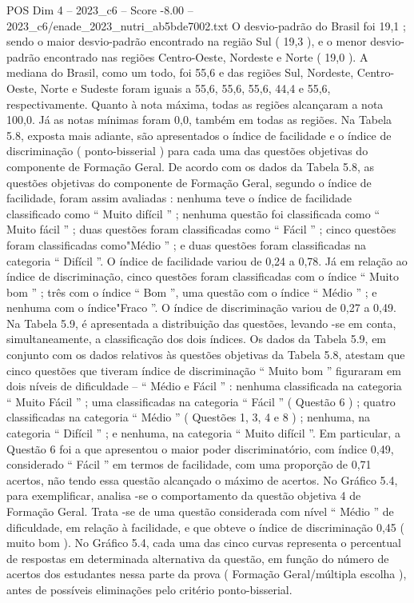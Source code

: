 \begin{textsample}{POS Dim 4 – 2023\_c6 – Score -8.00 – 2023\_c6/enade\_2023\_nutri\_ab5bde7002.txt}
O desvio-padrão do Brasil foi 19,1 ; sendo o maior desvio-padrão encontrado na região Sul ( 19,3 ), e o menor desvio-padrão encontrado nas regiões Centro-Oeste, Nordeste e Norte ( 19,0 ).
A mediana do Brasil, como um todo, foi 55,6 e das regiões Sul, Nordeste, Centro-Oeste, Norte e Sudeste foram iguais a 55,6, 55,6, 55,6, 44,4 e 55,6, respectivamente.
Quanto à nota máxima, todas as regiões alcançaram a nota 100,0.
Já as notas mínimas foram 0,0, também em todas as regiões.
Na Tabela 5.8, exposta mais adiante, são apresentados o índice de facilidade e o índice de discriminação ( ponto-bisserial ) para cada uma das questões objetivas do componente de Formação Geral.
De acordo com os dados da Tabela 5.8, as questões objetivas do componente de Formação Geral, segundo o índice de facilidade, foram assim avaliadas : nenhuma teve o índice de facilidade classificado como “ Muito difícil ” ; nenhuma questão foi classificada como “ Muito fácil ” ; duas questões foram classificadas como “ Fácil ” ; cinco questões foram classificadas como"Médio ” ; e duas questões foram classificadas na categoria “ Difícil ”.
O índice de facilidade variou de 0,24 a 0,78.
Já em relação ao índice de discriminação, cinco questões foram classificadas com o índice “ Muito bom ” ; três com o índice “ Bom ”, uma questão com o índice “ Médio ” ; e nenhuma com o índice"Fraco ”.
O índice de discriminação variou de 0,27 a 0,49.
Na Tabela 5.9, é apresentada a distribuição das questões, levando -se em conta, simultaneamente, a classificação dos dois índices.
Os dados da Tabela 5.9, em conjunto com os dados relativos às questões objetivas da Tabela 5.8, atestam que cinco questões que tiveram índice de discriminação “ Muito bom ” figuraram em dois níveis de dificuldade – “ Médio e Fácil ” : nenhuma classificada na categoria “ Muito Fácil ” ; uma classificadas na categoria “ Fácil ” ( Questão 6 ) ; quatro classificadas na categoria “ Médio ” ( Questões 1, 3, 4 e 8 ) ; nenhuma, na categoria “ Difícil ” ; e nenhuma, na categoria “ Muito difícil ”.
Em particular, a Questão 6 foi a que apresentou o maior poder discriminatório, com índice 0,49, considerado “ Fácil ” em termos de facilidade, com uma proporção de 0,71 acertos, não tendo essa questão alcançado o máximo de acertos.
No Gráfico 5.4, para exemplificar, analisa -se o comportamento da questão objetiva 4 de Formação Geral.
Trata -se de uma questão considerada com nível “ Médio ” de dificuldade, em relação à facilidade, e que obteve o índice de discriminação 0,45 ( muito bom ).
No Gráfico 5.4, cada uma das cinco curvas representa o percentual de respostas em determinada alternativa da questão, em função do número de acertos dos estudantes nessa parte da prova ( Formação Geral/múltipla escolha ), antes de possíveis eliminações pelo critério ponto-bisserial.

\end{textsample}
